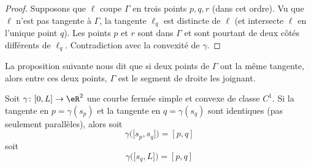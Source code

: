 \begin{proof}
    Supposons que \( \ell\) coupe \( \Gamma\) en trois points \( p,q,r\) (dans cet ordre). Vu que \( \ell\) n'est pas tangente à \( \Gamma\), la tangente \( \ell_q\) est distincte de \( \ell\) (et intersecte \( \ell\) en l'unique point \( q\)). Les points \( p\) et \( r\) sont dans \( \Gamma\) et sont pourtant de deux côtés différents de \( \ell_q\). Contradiction avec la convexité de \( \gamma\).
\end{proof}

La proposition suivante nous dit que si deux points de \( \Gamma\) ont la même tangente, alors entre ces deux points, \( \Gamma\) est le segment de droite les joignant.
\begin{proposition}     \label{PROPooCKTZooIPcUca}
    Soit \( \gamma\colon \mathopen[ 0 , L \mathclose]\to \eR^2\) une courbe fermée simple et convexe de classe \( C^1\). Si la tangente en \( p=\gamma(s_p)\) et la tangente en \( q=\gamma(s_q)\) sont identiques (pas seulement parallèles), alors soit 
    \begin{equation}
        \gamma\big( \mathopen[ s_p , s_q \mathclose] \big)=[p,q]
    \end{equation}
    soit
    \begin{equation}
        \gamma\big( \mathopen[ s_q , L \mathclose] \big)=[p,q]
    \end{equation}
\end{proposition}

